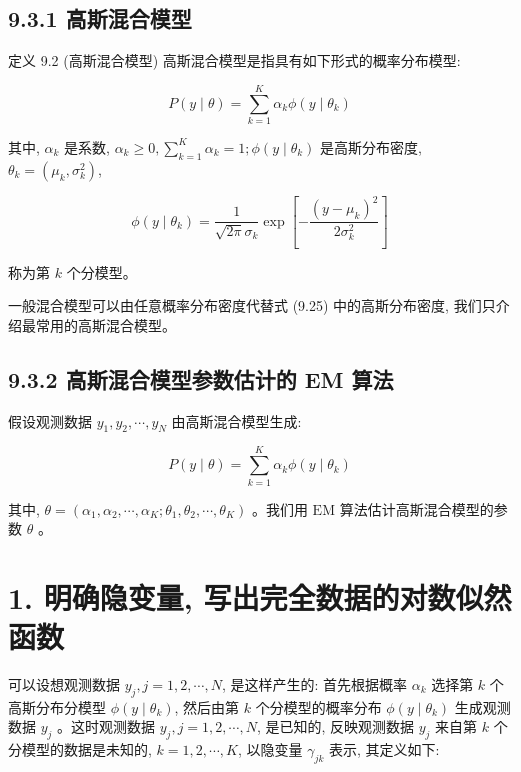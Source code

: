 \documentclass[10pt]{article}
\begin{document}
\subsection*{9.3.1 高斯混合模型}
定义 9.2 (高斯混合模型) 高斯混合模型是指具有如下形式的概率分布模型:


\begin{equation*}
P(y \mid \theta)=\sum_{k=1}^{K} \alpha_{k} \phi\left(y \mid \theta_{k}\right) \tag{9.24}
\end{equation*}


其中, $\alpha_{k}$ 是系数, $\alpha_{k} \geqslant 0, \sum_{k=1}^{K} \alpha_{k}=1 ; \phi\left(y \mid \theta_{k}\right)$ 是高斯分布密度, $\theta_{k}=\left(\mu_{k}, \sigma_{k}^{2}\right)$,


\begin{equation*}
\phi\left(y \mid \theta_{k}\right)=\frac{1}{\sqrt{2 \pi} \sigma_{k}} \exp \left[-\frac{\left(y-\mu_{k}\right)^{2}}{2 \sigma_{k}^{2}}\right] \tag{9.25}
\end{equation*}


称为第 $k$ 个分模型。

一般混合模型可以由任意概率分布密度代替式 (9.25) 中的高斯分布密度, 我们只介绍最常用的高斯混合模型。

\subsection*{9.3.2 高斯混合模型参数估计的 EM 算法}
假设观测数据 $y_{1}, y_{2}, \cdots, y_{N}$ 由高斯混合模型生成:


\begin{equation*}
P(y \mid \theta)=\sum_{k=1}^{K} \alpha_{k} \phi\left(y \mid \theta_{k}\right) \tag{9.26}
\end{equation*}


其中, $\theta=\left(\alpha_{1}, \alpha_{2}, \cdots, \alpha_{K} ; \theta_{1}, \theta_{2}, \cdots, \theta_{K}\right)$ 。我们用 $\mathrm{EM}$ 算法估计高斯混合模型的参数 $\theta$ 。

\section*{1. 明确隐变量, 写出完全数据的对数似然函数}
可以设想观测数据 $y_{j}, j=1,2, \cdots, N$, 是这样产生的: 首先根据概率 $\alpha_{k}$ 选择第 $k$ 个高斯分布分模型 $\phi\left(y \mid \theta_{k}\right)$, 然后由第 $k$ 个分模型的概率分布 $\phi\left(y \mid \theta_{k}\right)$ 生成观测数据 $y_{j}$ 。这时观测数据 $y_{j}, j=1,2, \cdots, N$, 是已知的, 反映观测数据 $y_{j}$ 来自第 $k$ 个分模型的数据是未知的, $k=1,2, \cdots, K$, 以隐变量 $\gamma_{j k}$ 表示, 其定义如下:
\end{document}
